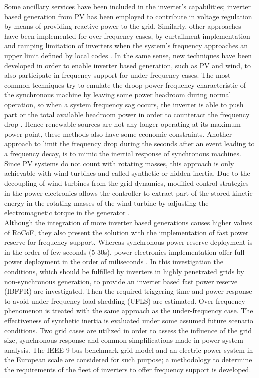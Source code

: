 Some ancillary services have been included in the inverter’s capabilities; inverter based generation from PV has been employed to contribute in voltage regulation by means of providing reactive power to the grid. Similarly, other approaches have been implemented for over frequency cases, by curtailment implementation and ramping limitation of inverters when the system's frequency approaches an upper limit defined by local codes \cite{hoke2018fast, hokefreqwatt}. In the same sense, new techniques have been developed in order to enable inverter based generation, such as PV and wind, to also participate in frequency support for under-frequency cases. The most common techniques try to emulate the droop power-frequency characteristic of the synchronous machine by leaving some power headroom during normal operation, so when a system frequency sag occurs, the inverter is able to push part or the total available headroom power in order to counteract the frequency drop \cite{dreidy2017inertia}. Hence renewable sources are not any longer operating at its maximum power point, these methods also have some economic constraints. Another approach to limit the frequency drop during the seconds after an event leading to a frequency decay, is to mimic the inertial response of synchronous machines. Since PV systems do not count with rotating masses, this approach is only achievable with wind turbines and called synthetic or hidden inertia. Due to the decoupling of wind turbines from the grid dynamics, modified control strategies in the power electronics allows the controller to extract part of the stored kinetic energy in the rotating masses of the wind turbine by adjusting the electromagnetic torque in the generator \cite{dreidy2017inertia}. \\

Although the integration of more inverter based generations causes higher values of RoCoF, they also present the solution with the implementation of fast power reserve for frequency support. Whereas synchronous power reserve deployment is in the order of few seconds (5-30s), power electronics implementation offer full power deployment in the order of miliseconds \cite{miller2017technology}. In this investigation the conditions, which should be fulfilled by inverters in highly penetrated grids by non-synchronous generation, to provide an inverter based fast power reserve (IBFPR) are investigated. Then the required triggering time and power response to avoid under-frequency load shedding (UFLS) are estimated. Over-frequency phenomenon is treated with the same approach as the under-frequency case. The effectiveness of synthetic inertia is evaluated under some assumed future scenario conditions. Two grid cases are utilized in order to assess the influence of the grid size, synchronous response and common simplifications made in power system analysis. The IEEE 9 bus benchmark grid model and an electric power system in the European scale are considered for such purpose; a methodology to determine the requirements of the fleet of inverters to offer frequency support is developed.